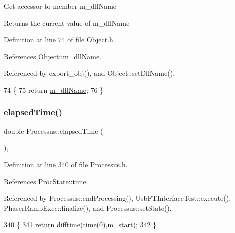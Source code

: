 Get accessor to member m\+\_\+dll\+Name \begin{DoxyReturn}{Returns}
the current value of m\+\_\+dll\+Name 
\end{DoxyReturn}


Definition at line 74 of file Object.\+h.



References Object\+::m\+\_\+dll\+Name.



Referenced by export\+\_\+obj(), and Object\+::set\+Dll\+Name().


\begin{DoxyCode}
74                        \{
75     \textcolor{keywordflow}{return} \hyperlink{classObject_a01afbeacebb8db6831559972ec362eb3}{m\_dllName};
76   \}  
\end{DoxyCode}
\mbox{\label{classProcessus_aecca96218c65bc805c988cd95447df55}} 
\subsubsection{\texorpdfstring{elapsed\+Time()}{elapsedTime()}\hspace{0.1cm}{\footnotesize\ttfamily [1/2]}}
{\footnotesize\ttfamily double Processus\+::elapsed\+Time (\begin{DoxyParamCaption}{ }\end{DoxyParamCaption})\hspace{0.3cm}{\ttfamily [inline]}, {\ttfamily [inherited]}}



Definition at line 340 of file Processus.\+h.



References Proc\+State\+::time.



Referenced by Processus\+::end\+Processing(), Usb\+F\+T\+Interface\+Test\+::execute(), Phaser\+Ramp\+Exec\+::finalize(), and Processus\+::set\+State().


\begin{DoxyCode}
340                        \{
341     \textcolor{keywordflow}{return} difftime(time(0),\hyperlink{classProcessus_a8ec00b2e12c5beada932610f30218e93}{m\_start});
342   \}
\end{DoxyCode}
\mbox{\label{classProcessus_a06d3815ad56593dfd0d3c1f534f8b146}} 
